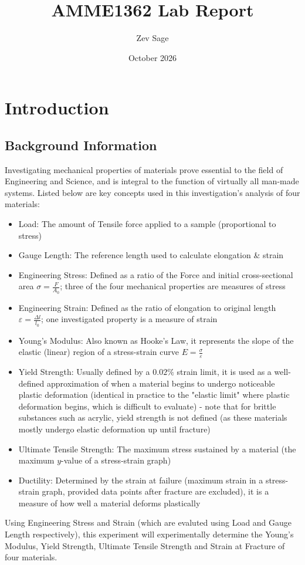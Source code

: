 \documentclass{article}
\title{AMME1362 Lab Report}
\author{Zev Sage}
\date{October 2026}
\begin{document}
\maketitle
\newpage

\section{Introduction}
\subsection{Background Information}
Investigating mechanical properties of materials prove essential to the field of Engineering and Science, and is integral to the function of virtually all man-made systems. Listed below are key concepts used in this investigation's analysis of four materials:
\begin{itemize}
    \item Load: The amount of Tensile force applied to a sample (proportional to stress)
    \item Gauge Length: The reference length used to calculate elongation \& strain \cite{instron_gauge_length}
    \item Engineering Stress: Defined as a ratio of the Force and initial cross-sectional area $\sigma = \frac{F}{A_0}$; three of the four mechanical properties are measures of stress
    \item Engineering Strain: Defined as the ratio of elongation to original length $\varepsilon = \frac{\Delta l}{l_0}$; one investigated property is a measure of strain
    \item Young's Modulus: Also known as Hooke's Law, it represents the slope of the elastic (linear) region of a stress-strain curve $E=\frac{\sigma}{\varepsilon}$
    \item Yield Strength: Usually defined by a $0.02\%$ strain limit, it is used as a well-defined approximation of when a material begins to undergo noticeable plastic deformation (identical in practice to the "elastic limit" where plastic deformation begins, which is difficult to evaluate) - note that for brittle substances such as acrylic, yield strength is not defined (as these materials mostly undergo elastic deformation up until fracture)
    \item Ultimate Tensile Strength: The maximum stress sustained by a material (the maximum $y$-value of a stress-strain graph)
    \item Ductility: Determined by the strain at failure (maximum strain in a stress-strain graph, provided data points after fracture are excluded), it is a measure of how well a material deforms plastically
\end{itemize}
Using Engineering Stress and Strain (which are evaluted using Load and Gauge Length respectively), this experiment will experimentally determine the Young's Modulus, Yield Strength, Ultimate Tensile Strength and Strain at Fracture of four materials.
\end{document}
